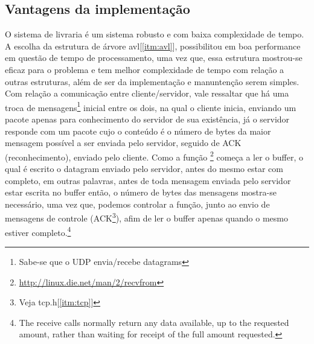 \documentclass[a4paper,10pt]{article}
\begin{document}
\subsection{Vantagens da implementação}
O sistema de livraria é um sistema robusto e com baixa complexidade de tempo.
A escolha da estrutura de árvore avl[\ref{itm:avl}], possibilitou em boa 
performance em questão de tempo de processamento, uma vez que, essa estrutura
mostrou-se eficaz para o problema e tem melhor complexidade de tempo com 
relação a outras estruturas, além de ser da implementação e manuntenção serem
simples.
\\ Com relação a comunicação entre cliente/servidor, vale ressaltar que há uma troca de mensagens\footnote{Sabe-se que o UDP envia/recebe datagrams} inicial entre os dois, na qual o cliente inicia, enviando um pacote apenas para conhecimento do servidor de sua existência, já o servidor responde com um pacote cujo o conteúdo é o número de bytes da maior mensagem possível a ser enviada pelo servidor, seguido de ACK (reconhecimento), enviado pelo cliente.
Como a função \footnote{\url{http://linux.die.net/man/2/recvfrom}} começa a ler o buffer, o qual é escrito o datagram enviado pelo servidor, antes do mesmo estar com completo, em outras palavras, antes de toda mensagem enviada pelo servidor estar escrita no buffer então, o número de bytes das mensagens mostra-se necessário, uma vez que, podemos controlar a função, junto ao envio de mensagens de controle (ACK\footnote{Veja tcp.h[\ref{itm:tcp}]}), afim de ler o buffer apenas quando o mesmo estiver completo.\footnote{The receive calls normally return any data available, up to the requested amount, rather than waiting for receipt of the full amount requested.}
\end{document}

